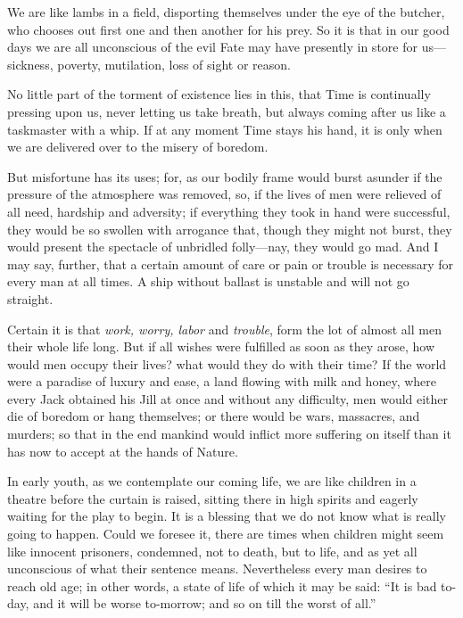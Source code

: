 We are like lambs in a field, disporting themselves under the eye of
the butcher, who chooses out first one and then another for his prey.
So it is that in our good days we are all unconscious of the evil Fate
may have presently in store for us---sickness, poverty, mutilation,
loss of sight or reason.

No little part of the torment of existence lies in this, that Time is
continually pressing upon us, never letting us take breath, but always
coming after us like a taskmaster with a whip. If at any moment Time
stays his hand, it is only when we are delivered over to the misery of
boredom.

But misfortune has its uses; for, as our bodily frame would burst
asunder if the pressure of the atmosphere was removed, so, if the
lives of men were relieved of all need, hardship and adversity; if
everything they took in hand were successful, they would be so swollen
with arrogance that, though they might not burst, they would present
the spectacle of  unbridled folly---nay, they would go mad.
And I may say, further, that a certain amount of care or pain or
trouble is necessary for every man at all times. A ship without
ballast is unstable and will not go straight.

Certain it is that \textit{work, worry, labor} and \textit{trouble},
form the lot of almost all men their whole life long. But if all
wishes were fulfilled as soon as they arose, how would men occupy
their lives? what would they do with their time? If the world were a
paradise of luxury and ease, a land flowing with milk and honey, where
every Jack obtained his Jill at once and without any difficulty, men
would either die of boredom or hang themselves; or there would be
wars, massacres, and murders; so that in the end mankind would inflict
more suffering on itself than it has now to accept at the hands of
Nature.

In early youth, as we contemplate our coming life, we are like
children in a theatre before the curtain is raised, sitting there in
high spirits and eagerly waiting for the play to begin. It is a
blessing that we do not know what is really going to happen. Could we
foresee it, there are times when children might seem like innocent
prisoners, condemned, not to death, but to life, and as yet all
unconscious of what their sentence means. Nevertheless every man
desires to reach old age; in other words, a state of life of which it
may be said: ``It is bad to-day, and it will be worse to-morrow; and
so on till the worst of all.''


